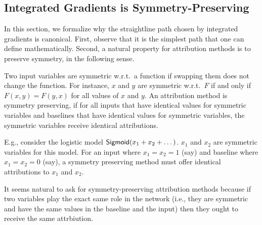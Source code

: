 \subsection{Integrated Gradients is Symmetry-Preserving}

In this section, we formalize why the straightline path chosen by integrated
gradients is canonical.  First, observe that it is the simplest path
that one can define mathematically.  Second, a natural property for
attribution methods is to preserve symmetry, in the following sense.

 Two input variables are symmetric
w.r.t.\ a function if swapping them does not change the function.
For instance, $x$ and $y$ are symmetric w.r.t.\ $F$ if and only if
$F(x, y) = F(y, x)$ for all values of $x$ and $y$.
An attribution method
is symmetry preserving, if for all inputs that have identical values
for symmetric variables and baselines that have identical
values for symmetric variables,  the symmetric variables receive identical
attributions.

E.g., consider the logistic model $\mathsf{Sigmoid}(x_1+x_2+\dots)$.
$x_1$ and $x_2$ are symmetric variables for this model. For
an input where $x_1 = x_2 = 1$ (say) and baseline where $x_1 = x_2 = 0$ (say),
a symmetry preserving method must offer identical attributions to $x_1$ and $x_2$.

It seems natural to ask for symmetry-preserving attribution methods because if two
variables play the exact same role in the network (i.e., they are
symmetric and have the same values in the baseline and the input) then they ought to
receive the same attrbiution.


